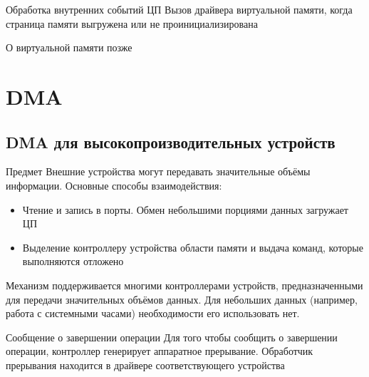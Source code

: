 \documentclass[xetex,aspectratio=43]{beamer}
\begin{document}
\begin{frame}
	\begin{block}{Обработка внутренних событий ЦП}
		Вызов драйвера виртуальной памяти, когда страница памяти выгружена или
		не проинициализирована

		\pause

		О виртуальной памяти позже

	\end{block}
\end{frame}

\section{DMA}

\subsection{DMA для высокопроизводительных устройств}

\begin{frame}
	\begin{block}{Предмет}
		Внешние устройства могут передавать значительные объёмы информации.
		Основные способы взаимодействия:

		\begin{itemize}
			\tightlist
			\item
			Чтение и запись в порты. Обмен небольшими порциями данных загружает ЦП
			\item
			Выделение контроллеру устройства области памяти и выдача команд,
			которые выполняются отложено
		\end{itemize}

		\pause


		Механизм поддерживается многими контроллерами устройств,
		предназначенными для передачи значительных объёмов данных. Для небольших данных (например, работа с системными часами) необходимости его использовать нет.
	\end{block}
\end{frame}

\begin{frame}
	\begin{block}{Сообщение о завершении операции}
		Для того чтобы сообщить о завершении операции, контроллер генерирует
		аппаратное прерывание. Обработчик прерывания находится в драйвере
		соответствующего устройства
	\end{block}
\end{frame}
\end{document}
